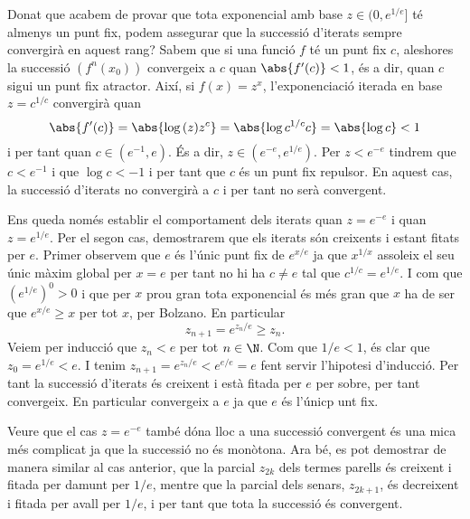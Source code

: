 \documentclass[12pt,a4paper]{article}
\begin{document}
Donat que acabem de provar que tota exponencial amb base \( z \in (0, e^{1/e}] \) té almenys un punt fix, podem assegurar que la successió d'iterats sempre convergirà en aquest rang? Sabem que si una funció \( f \) té un punt fix \( c \), aleshores la successió \( \left(f^n(x_0)\right) \) convergeix a \( c \) quan \( \abs{f'(c)} < 1 \), és a dir, quan \( c \) sigui un punt fix atractor. Així, si \( f(x) = z^x \), l'exponenciació iterada en base \( z = c^{1/c} \) convergirà quan 
\begin{equation*}
	\abs{f'(c)} = \abs{\log{(z)}z^c} = \abs{\log{c^{1/c}}c} = \abs{\log{c}} < 1
\end{equation*}
i per tant quan \( c \in (e^{-1}, e) \). És a dir, \( z \in (e^{-e}, e^{1/e}) \). Per \( z < e^{-e} \) tindrem que \( c < e^{-1} \) i que \( \log{c} < -1 \) i per tant que \( c \) és un punt fix repulsor. En aquest cas, la successió d'iterats no convergirà a \( c \) i per tant no serà convergent. 

Ens queda només establir el comportament dels iterats quan \( z = e^{-e} \) i quan \( z = e^{1/e} \). Per el segon cas, demostrarem que els iterats són creixents i estant fitats per \( e \). Primer observem que \( e \) és l'únic punt fix de \( e^{x/e} \) ja que \( x^{1/x} \) assoleix el seu únic màxim global per \( x = e \) per tant no hi ha \( c \neq e \) tal que \( c^{1/c} = e^{1/e} \). I com que \( (e^{1/e})^0 > 0 \) i que per \( x \) prou gran tota exponencial és més gran que \( x \) ha de ser que \( e^{x/e} \geq x \) per tot \( x \), per Bolzano. En particular
\begin{equation*}
z_{n+1} = e^{z_{n}/e} \geq z_{n}.
\end{equation*}
Veiem per inducció que \( z_n < e \) per tot \( n \in \N \). Com que \( 1/e < 1 \), és clar que \( z_0 = e^{1/e} < e \). I tenim \( z_{n+1} = e^{z_n / e} < e^{e/e} = e \) fent servir l'hipotesi d'inducció. Per tant la successió d'iterats és creixent i està fitada per \( e \) per sobre, per tant convergeix. En particular convergeix a \( e \) ja que \( e \) és l'únicp unt fix. 

Veure que el cas \( z = e^{-e} \) també dóna lloc a una successió convergent és una mica més complicat ja que la successió no és monòtona. Ara bé, es pot demostrar de manera similar al cas anterior, que la parcial \( z_{2k} \) dels termes parells és creixent i fitada per damunt per \( 1/e \), mentre que la parcial dels senars, \( z_{2k + 1} \), és decreixent i fitada per avall per \( 1/e \), i per tant que tota la successió és convergent.
\end{document}
